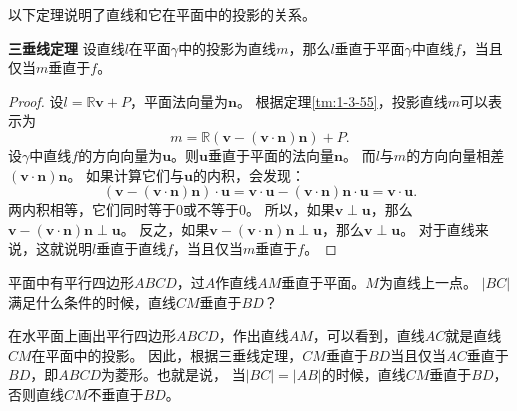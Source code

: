 \documentclass[12pt,UTF8,fontset=none]{ctexbook}
\begin{document}
以下定理说明了直线和它在平面中的投影的关系。
\begin{tm}{\textbf{三垂线定理}}\label{tm:1-3-57}
    设直线$l$在平面$\gamma$中的投影为直线$m$，那么$l$垂直于平面$\gamma$中直线$f$，当且仅当$m$垂直于$f$。
\end{tm}
\begin{proof}
    设$l=\mathbb{R}\mathbf{v}+P$，平面法向量为$\mathbf{n}$。
    根据定理\ref{tm:1-3-55}，投影直线$m$可以表示为
    $$m = \mathbb{R}(\mathbf{v} - (\mathbf{v}\cdot\mathbf{n})\mathbf{n}) + P.$$
    设$\gamma$中直线$f$的方向向量为$\mathbf{u}$。则$\mathbf{u}$垂直于平面的法向量$\mathbf{n}$。
    而$l$与$m$的方向向量相差$(\mathbf{v}\cdot\mathbf{n})\mathbf{n}$。
    如果计算它们与$\mathbf{u}$的内积，会发现：
    $$ (\mathbf{v} - (\mathbf{v}\cdot\mathbf{n})\mathbf{n})\cdot \mathbf{u} = \mathbf{v} \cdot \mathbf{u} - (\mathbf{v}\cdot\mathbf{n})\mathbf{n} \cdot \mathbf{u} = \mathbf{v} \cdot \mathbf{u}. $$
    两内积相等，它们同时等于$0$或不等于$0$。
    所以，如果$\mathbf{v} \perp \mathbf{u}$，那么$\mathbf{v} - (\mathbf{v}\cdot\mathbf{n})\mathbf{n} \perp \mathbf{u}$。
    反之，如果$\mathbf{v} - (\mathbf{v}\cdot\mathbf{n})\mathbf{n} \perp \mathbf{u}$，那么$\mathbf{v} \perp \mathbf{u}$。
    对于直线来说，这就说明$l$垂直于直线$f$，当且仅当$m$垂直于$f$。
\end{proof}

\begin{et}\label{et:1-3-10}
    平面中有平行四边形$ABCD$，过$A$作直线$AM$垂直于平面。$M$为直线上一点。
    $|BC|$满足什么条件的时候，直线$CM$垂直于$BD$？
\end{et}
\begin{so}
    在水平面上画出平行四边形$ABCD$，作出直线$AM$，可以看到，直线$AC$就是直线$CM$在平面中的投影。
    因此，根据三垂线定理，$CM$垂直于$BD$当且仅当$AC$垂直于$BD$，即$ABCD$为菱形。也就是说，
    当$|BC|=|AB|$的时候，直线$CM$垂直于$BD$，否则直线$CM$不垂直于$BD$。
\end{so}
\end{document}
